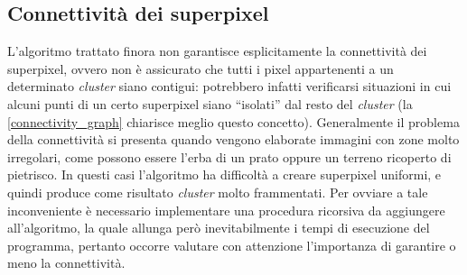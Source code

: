 \documentclass[12pt,a4paper,oneside]{article}
\begin{document}
\subsection{Connettività dei superpixel}
L'algoritmo trattato finora non garantisce esplicitamente la connettività dei superpixel, ovvero non è assicurato che tutti i pixel appartenenti a un determinato \textit{cluster} siano contigui: potrebbero infatti verificarsi situazioni in cui alcuni punti di un certo superpixel siano ``isolati'' dal resto del \textit{cluster} (la \cref{connectivity_graph} chiarisce meglio questo concetto). Generalmente il problema della connettività si presenta quando vengono elaborate immagini con zone molto irregolari, come possono essere l'erba di un prato oppure un terreno ricoperto di pietrisco. In questi casi l'algoritmo ha difficoltà a creare superpixel uniformi, e quindi produce come risultato \textit{cluster} molto frammentati. Per ovviare a tale inconveniente è necessario implementare una procedura ricorsiva da aggiungere all'algoritmo, la quale allunga però inevitabilmente i tempi di esecuzione del programma, pertanto occorre valutare con attenzione l'importanza di garantire o meno la connettività.
\end{document}

